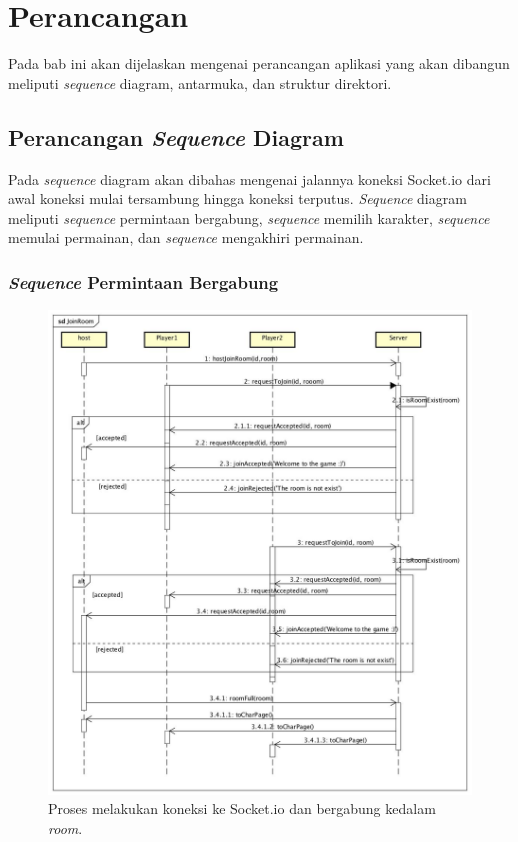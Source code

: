 \chapter{Perancangan}
\label{chap:perancangan}

Pada bab ini akan dijelaskan mengenai perancangan aplikasi yang akan dibangun meliputi \textit{sequence} diagram, antarmuka, dan struktur direktori.

\section{Perancangan \textit{Sequence} Diagram}

Pada \textit{sequence} diagram akan dibahas mengenai jalannya koneksi Socket.io dari awal koneksi mulai tersambung hingga koneksi terputus. \textit{Sequence} diagram meliputi \textit{sequence} permintaan bergabung, \textit{sequence} memilih karakter, \textit{sequence} memulai permainan, dan \textit{sequence} mengakhiri permainan.

\subsection{\textit{Sequence} Permintaan Bergabung}

\begin{figure}[H]
	\centering
	\includegraphics[scale=0.25]{Gambar/JoinRoom}
	\caption{Proses melakukan koneksi ke Socket.io dan bergabung kedalam \textit{room}.}
	\label{fig:1_JoinRoom}
\end{figure}

